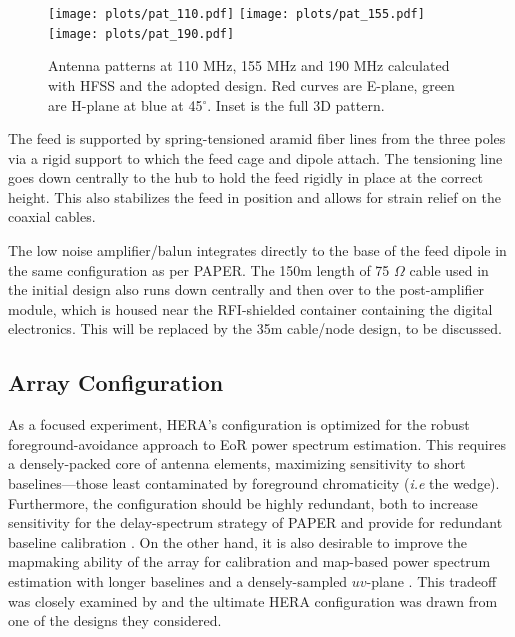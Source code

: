 \documentclass[preprint,11pt]{aastex}
\begin{document}
\begin{figure}[h!]
\centerline{
\texttt{[image: plots/pat\_110.pdf]}
\texttt{[image: plots/pat\_155.pdf]}
\texttt{[image: plots/pat\_190.pdf]}
}
\caption{\small Antenna patterns at 110 MHz, 155 MHz and 190 MHz calculated with HFSS and the adopted design.  Red curves are E-plane, green are H-plane at blue at 45$^\circ$.  Inset is the full 3D pattern.}
\label{fig:beampatterns}
\end{figure}


The feed is supported by spring-tensioned aramid fiber lines from the three poles via a rigid support to which the feed cage and dipole attach.  The tensioning line goes down centrally to the hub to hold the feed rigidly in place at the correct height.  This also stabilizes the feed in position and allows for strain relief on the coaxial cables.  

The low noise amplifier/balun integrates directly to the base of the feed dipole in the same configuration as per PAPER.  The 150m length of 75 $\Omega$ cable used in the initial design also runs down centrally and then over to the post-amplifier module, which is housed near the RFI-shielded container containing the digital electronics.  This will be replaced by the 35m cable/node design, to be discussed.


\subsection{Array Configuration}
\label{sec:arrayConfig}

As a focused experiment, HERA's configuration is optimized for the robust foreground-avoidance approach to EoR power spectrum estimation. 
This requires a densely-packed core of antenna elements, maximizing sensitivity to short baselines---those least contaminated by foreground chromaticity ({\em i.e} the wedge). 
Furthermore, the configuration should be highly redundant, both to increase sensitivity for the delay-spectrum strategy of PAPER \citep{parsons_et_al2012a} and provide for redundant baseline calibration \citep{liu_et_al2010,zheng_et_al2014}.
On the other hand, it is also desirable to improve the mapmaking ability of the array for calibration and map-based power spectrum estimation with longer baselines and a densely-sampled $uv$-plane \citep{dillon_et_al2015a}. This tradeoff was closely examined by \citet{dillon_parsons2016} and the ultimate HERA configuration was drawn from one of the designs they considered.
\end{document}

